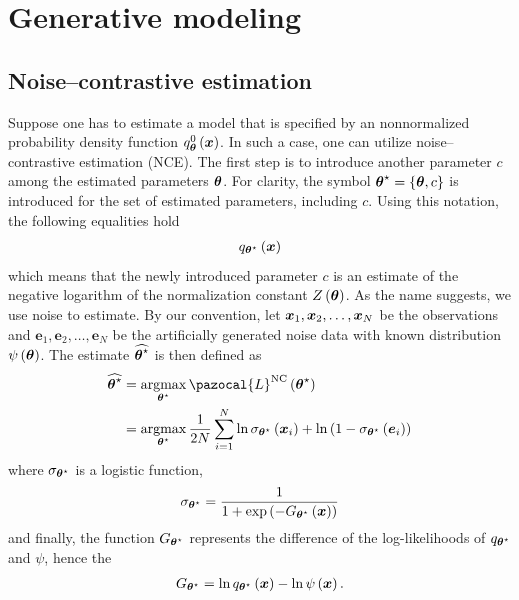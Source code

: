 \section{Generative modeling}



\subsection{Noise--contrastive estimation}
Suppose one has to estimate a model that is specified by an nonnormalized probability density function $q^0_{\boldsymbol{\theta}}\left(\boldsymbol{x}\right)$. In such a case, one can utilize noise--contrastive estimation (NCE). The first step is to introduce another parameter $c$ among the estimated parameters $\boldsymbol{\theta}$. For clarity, the symbol $\boldsymbol{\theta}^\star=\left\lbrace\boldsymbol{\theta},c\right\rbrace$ is introduced for the set of estimated parameters, including
$c$. Using this notation, the following equalities hold
\begin{align}
    q_{\boldsymbol{\theta}^\star}\left(\boldsymbol{x}\right)
    \end{align}
which means that the newly introduced parameter $c$ is an estimate of the negative logarithm of
the normalization constant $Z\left(\boldsymbol{\theta}\right)$.
As the name suggests, we use noise to estimate. By our convention, let $\boldsymbol{x}_1,\boldsymbol{x}_2,\dots,\boldsymbol{x}_N$
be the observations and $\boldsymbol{e}_1,\boldsymbol{e}_2,\dots,\boldsymbol{e}_N$ be the artificially generated noise data with known distribution $\psi\left(\boldsymbol{\theta}\right)$. The estimate $\widehat{\boldsymbol{\theta}^\star}$ is then defined as
\begin{align}
    \widehat{\bt^\star} &= \argmax_{\bt^\star} \pazocal{L}^{\mathrm{NC}}\left(\bt^\star\right)\\
   &= \argmax_{\bt^\star} \frac{1}{2N}\sum_{i=1}^N \ln\sigma_{\bt^\star}\left(\bx_i\right) + \ln\left(1-\sigma_{\bt^\star}\left(\boldsymbol{e}_i\right) \right)\label{NCEloss}
\end{align}
where $\sigma_{\boldsymbol{\theta}^\star}$ is a logistic function,
\begin{align}
\sigma_{\boldsymbol{\theta}^\star} = \frac{1}{1 + \exp\left(-G_{\boldsymbol{\theta}^\star}\left(\boldsymbol{x}\right) \right)}
\end{align}
and finally, the function $G_{\boldsymbol{\theta}^\star}$ represents the difference of the log-likelihoods of $q_{\boldsymbol{\theta}^\star}$ and $\psi$, hence the
\begin{align}
    G_{\boldsymbol{\theta}^\star} = \ln q_{\boldsymbol{\theta}^\star}\left(\boldsymbol{x} \right) - \ln\psi\left(\boldsymbol{x} \right).
\end{align}
